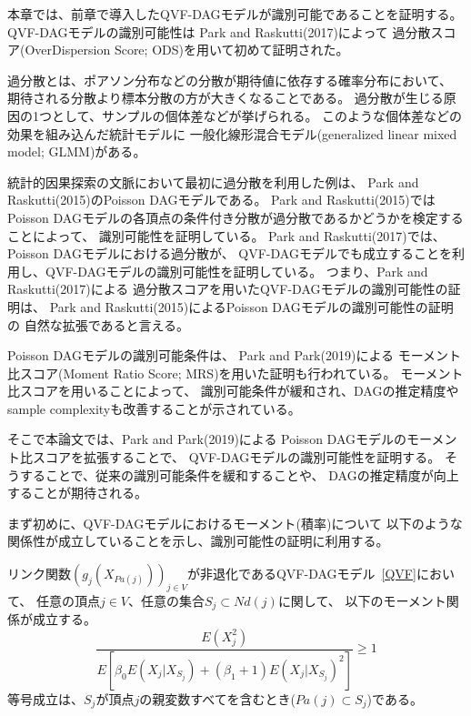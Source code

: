 

本章では、前章で導入したQVF-DAGモデル\cite{Park2017-hw}が識別可能であることを証明する。
QVF-DAGモデルの識別可能性は
Park and Raskutti(2017)\cite{Park2017-hw}によって
過分散スコア(OverDispersion Score; ODS)を用いて初めて証明された。

過分散とは、ポアソン分布などの分散が期待値に依存する確率分布において、
期待される分散より標本分散の方が大きくなることである。
過分散が生じる原因の1つとして、サンプルの個体差などが挙げられる。
このような個体差などの効果を組み込んだ統計モデルに
一般化線形混合モデル(generalized linear mixed model; GLMM)がある\cite{2012-iq}。

統計的因果探索の文脈において最初に過分散を利用した例は、
Park and Raskutti(2015)\cite{Park2015-tj}のPoisson DAGモデルである。
Park and Raskutti(2015)\cite{Park2015-tj}では
Poisson DAGモデルの各頂点の条件付き分散が過分散であるかどうかを検定することによって、
識別可能性を証明している。
Park and Raskutti(2017)\cite{Park2017-hw}では、
Poisson DAGモデルにおける過分散が、
QVF-DAGモデルでも成立することを利用し、QVF-DAGモデルの識別可能性を証明している。
つまり、Park and Raskutti(2017)\cite{Park2017-hw}による
過分散スコアを用いたQVF-DAGモデルの識別可能性の証明は、
Park and Raskutti(2015)\cite{Park2015-tj}によるPoisson DAGモデルの識別可能性の証明の
自然な拡張であると言える。

Poisson DAGモデルの識別可能条件は、
Park and Park(2019)\cite{Park2019-qy}による
モーメント比スコア(Moment Ratio Score; MRS)を用いた証明も行われている。
モーメント比スコアを用いることによって、
識別可能条件が緩和され、DAGの推定精度やsample complexityも改善することが示されている\cite{Park2019-qy}。

そこで本論文では、Park and Park(2019)\cite{Park2019-qy}による
Poisson DAGモデルのモーメント比スコアを拡張することで、
QVF-DAGモデルの識別可能性を証明する。
そうすることで、従来の識別可能条件\cite{Park2017-hw}を緩和することや、
DAGの推定精度が向上することが期待される。

まず初めに、QVF-DAGモデルにおけるモーメント(積率)について
以下のような関係性が成立していることを示し、識別可能性の証明に利用する。

\begin{prop} \label{prop:MRS}
  リンク関数$(g_j(X_{Pa(j)}))_{j \in V}$が非退化であるQVF-DAGモデル~\eqref{QVF}において、
  任意の頂点$j \in V$、任意の集合$S_j \subset \mathit{Nd}(j)$に関して、
  以下のモーメント関係が成立する。
  \begin{equation}
    \frac{E(X_j^2)}
    {E \left[ \beta_0 E(X_j | X_{S_j}) + (\beta_1 + 1)E(X_j | X_{S_j})^2 \right]}
    \geq 1
    \label{eq:MRS}
  \end{equation}
  等号成立は、$S_j$が頂点$j$の親変数すべてを含むとき($Pa(j)\subset S_j$)である。
\end{prop}

